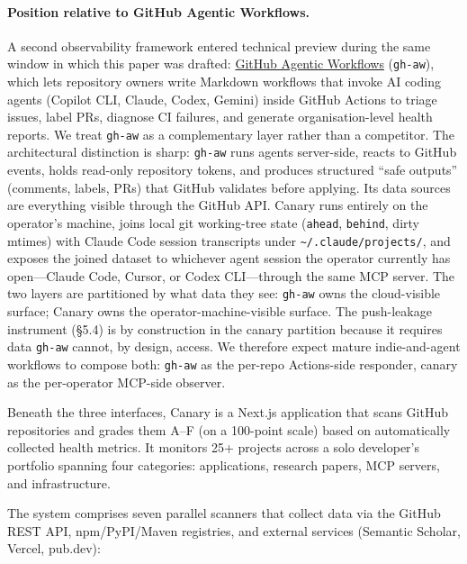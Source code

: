 \documentclass[sigconf, nonacm, anonymous=false]{acmart}
\begin{document}
\paragraph{Position relative to GitHub Agentic Workflows.}
A second observability framework entered technical preview during the same window in which this paper was drafted: \href{https://github.github.com/gh-aw/}{GitHub Agentic Workflows} (\texttt{gh-aw}), which lets repository owners write Markdown workflows that invoke AI coding agents (Copilot CLI, Claude, Codex, Gemini) inside GitHub Actions to triage issues, label PRs, diagnose CI failures, and generate organisation-level health reports. We treat \texttt{gh-aw} as a complementary layer rather than a competitor. The architectural distinction is sharp: \texttt{gh-aw} runs agents server-side, reacts to GitHub events, holds read-only repository tokens, and produces structured ``safe outputs'' (comments, labels, PRs) that GitHub validates before applying. Its data sources are everything visible through the GitHub API. Canary runs entirely on the operator's machine, joins local git working-tree state (\texttt{ahead}, \texttt{behind}, dirty mtimes) with Claude Code session transcripts under \texttt{\textasciitilde/.claude/projects/}, and exposes the joined dataset to whichever agent session the operator currently has open---Claude Code, Cursor, or Codex CLI---through the same MCP server. The two layers are partitioned by what data they see: \texttt{gh-aw} owns the cloud-visible surface; Canary owns the operator-machine-visible surface. The push-leakage instrument (\S5.4) is by construction in the canary partition because it requires data \texttt{gh-aw} cannot, by design, access. We therefore expect mature indie-and-agent workflows to compose both: \texttt{gh-aw} as the per-repo Actions-side responder, canary as the per-operator MCP-side observer.

Beneath the three interfaces, Canary is a Next.js application that scans GitHub repositories and grades them A--F (on a 100-point scale) based on automatically collected health metrics. It monitors 25+ projects across a solo developer's portfolio spanning four categories: applications, research papers, MCP servers, and infrastructure.

The system comprises seven parallel scanners that collect data via the GitHub REST API, npm/PyPI/Maven registries, and external services (Semantic Scholar, Vercel, pub.dev):
\end{document}
